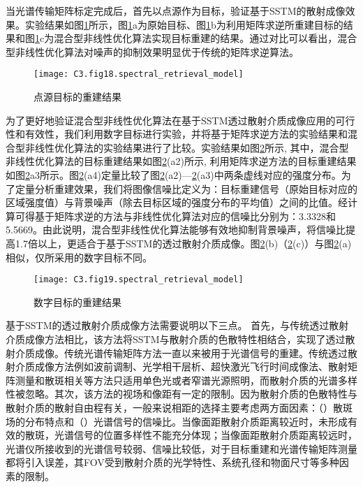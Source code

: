当光谱传输矩阵标定完成后，首先以点源作为目标，验证基于SSTM的散射成像效果。实验结果如图\ref{fig:3.18}所示，图\ref{fig:3.18}a为原始目标、图\ref{fig:3.18}b为利用矩阵求逆所重建目标的结果和图\ref{fig:3.18}c为混合型非线性优化算法实现目标重建的结果。通过对比可以看出，混合型非线性优化算法对噪声的抑制效果明显优于传统的矩阵求逆算法。
\begin{figure}[htp]
	\centering
	\texttt{[image: C3.fig18.spectral\_retrieval\_model]}
	\caption{点源目标的重建结果}
	\label{fig:3.18}
\end{figure}

为了更好地验证混合型非线性优化算法在基于SSTM透过散射介质成像应用的可行性和有效性，我们利用数字目标进行实验，并将基于矩阵求逆方法的实验结果和混合型非线性优化算法的实验结果进行了比较。实验结果如图\ref{fig:3.19}所示, 其中，混合型非线性优化算法的目标重建结果如图\ref{fig:3.19}(a2)所示, 利用矩阵求逆方法的目标重建结果如图\ref{fig:3.19}a3所示。图\ref{fig:3.19}(a4)定量比较了图\ref{fig:3.19}(a2)—\ref{fig:3.19}(a3)中两条虚线对应的强度分布。为了定量分析重建效果，我们将图像信噪比定义为：目标重建信号（原始目标对应的区域强度值）与背景噪声（除去目标区域的强度分布的平均值）之间的比值。经计算可得基于矩阵求逆的方法与非线性优化算法对应的信噪比分别为：3.3328和5.5669。由此说明，混合型非线性优化算法能够有效地抑制背景噪声，将信噪比提高1.7倍以上，更适合于基于SSTM的透过散射介质成像。图\ref{fig:3.19}(b)（\ref{fig:3.19}(c)）与图\ref{fig:3.19}(a)相似，仅所采用的数字目标不同。

\begin{figure}[htp]
	\centering
	\texttt{[image: C3.fig19.spectral\_retrieval\_model]}
	\caption{数字目标的重建结果}
	\label{fig:3.19}
\end{figure}

基于SSTM的透过散射介质成像方法需要说明以下三点。 首先，与传统透过散射介质成像方法相比，该方法将SSTM与散射介质的色散特性相结合，实现了透过散射介质成像。传统光谱传输矩阵方法一直以来被用于光谱信号的重建。传统透过散射介质成像方法例如波前调制、光学相干层析、超快激光飞行时间成像法、散射矩阵测量和散斑相关等方法只适用单色光或者窄谱光源照明，而散射介质的光谱多样性被忽略。其次，该方法的视场和像距有一定的限制。因为散射介质的色散特性与散射介质的散射自由程有关，一般来说相距的选择主要考虑两方面因素：（）散斑场的分布特点和（）光谱信号的信噪比。当像面距散射介质距离较近时，未形成有效的散斑，光谱信号的位置多样性不能充分体现；当像面距散射介质距离较远时，光谱仪所接收到的光谱信号较弱、信噪比较低，对于目标重建和光谱传输矩阵测量都将引入误差，其FOV受到散射介质的光学特性、系统孔径和物面尺寸等多种因素的限制。

